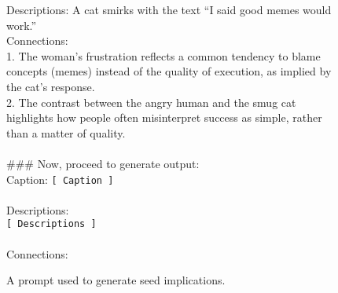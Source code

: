 \begin{figure*}[t]
\begin{tcolorbox}
\text{[}Descriptions\text{]}: A cat smirks with the text ``I said good memes would work.''\\
\text{[}Connections\text{]}:\\
1. The woman's frustration reflects a common tendency to blame concepts (memes) instead of the quality of execution, as implied by the cat’s response.\\
2. The contrast between the angry human and the smug cat highlights how people often misinterpret success as simple, rather than a matter of quality.\\
\\
\#\#\# Now, proceed to generate output:\\
\text{[}Caption\text{]}: \texttt{[ Caption ]}\\
\\
\text{[}Descriptions\text{]}:\\
\texttt{[ Descriptions ]}\\
\\
\text{[}Connections\text{]}:

\end{tcolorbox}
\caption{A prompt used to generate seed implications.} %
\label{fig:seed-imp-prompt}
\end{figure*}


